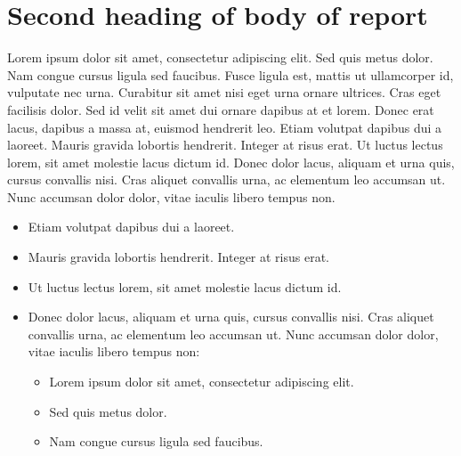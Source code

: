 \documentclass[10pt,a4paper]{article}
\begin{document}
\section{Second heading of body of report}
\label{sec.secondheading}
%
Lorem ipsum dolor sit amet, consectetur adipiscing elit. Sed quis metus dolor. Nam congue cursus ligula sed faucibus. Fusce ligula est, mattis ut ullamcorper id, vulputate nec urna. Curabitur sit amet nisi eget urna ornare ultrices. Cras eget facilisis dolor. Sed id velit sit amet dui ornare dapibus at et lorem. Donec erat lacus, dapibus a massa at, euismod hendrerit leo.
Etiam volutpat dapibus dui a laoreet. Mauris gravida lobortis hendrerit. Integer at risus erat. Ut luctus lectus lorem, sit amet molestie lacus dictum id. Donec dolor lacus, aliquam et urna quis, cursus convallis nisi. Cras aliquet convallis urna, ac elementum leo accumsan ut. Nunc accumsan dolor dolor, vitae iaculis libero tempus non.\\
%
\begin{itemize}
		\item	Etiam volutpat dapibus dui a laoreet. 
		\item Mauris gravida lobortis hendrerit. Integer at risus erat. 
		\item Ut luctus lectus lorem, sit amet molestie lacus dictum id. 
		\item Donec dolor lacus, aliquam et urna quis, cursus convallis nisi. Cras aliquet convallis urna, ac elementum leo accumsan ut. Nunc accumsan dolor dolor, vitae iaculis libero tempus non:

	\begin{itemize}
			\item Lorem ipsum dolor sit amet, consectetur adipiscing elit. 
			\item Sed quis metus dolor. 
			\item Nam congue cursus ligula sed faucibus.
	\end{itemize}
\end{itemize}
%
\end{document}
